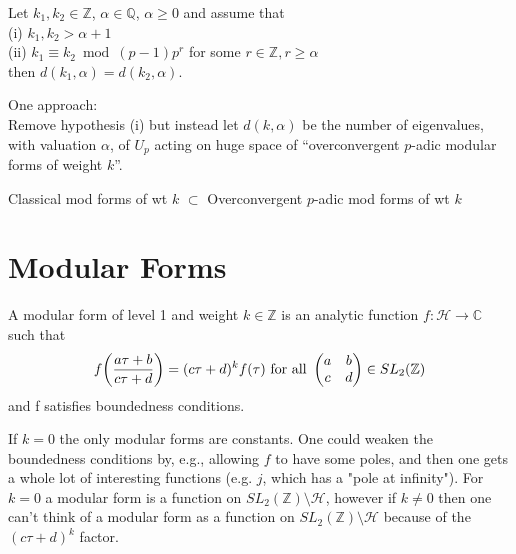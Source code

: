 \documentclass[11pt]{amsart}
\begin{document}
\begin{conj}
Let $k_1,k_2\in\mathbb Z$, $\alpha\in\mathbb Q$, $\alpha\geq 0$ and
assume that\\
(i) $k_1,k_2 > \alpha + 1$\\
(ii) $k_1 \equiv k_2 \bmod (p-1)p^r$ for some $r\in\mathbb Z, r\geq\alpha$\\
then $d(k_1,\alpha) = d(k_2,\alpha)$.
\end{conj}

\medskip

One approach:\\
Remove hypothesis (i) but instead let $d(k,\alpha)$ be the number of
eigenvalues, with valuation $\alpha$, of $U_p$ acting on huge space of
``overconvergent $p$-adic
modular forms of weight $k$''.
\begin{center}
Classical mod forms of wt $k$ $\subset$ Overconvergent
$p$-adic mod forms of wt $k$
\end{center}

\section{Modular Forms}

\begin{defn}
A modular form of level 1 and weight $k\in\mathbb Z$ is an analytic
function $f:\mathcal H \to \mathbb C$ such that
\begin{align*}
f\biggl( {a\tau + b \over c\tau + d} \biggr) = (c\tau +d)^kf(\tau)
\text{ for all } \begin{pmatrix} a&b \\ c&d \end{pmatrix}\in
SL_2(\mathbb Z)
\end{align*}
and f satisfies boundedness conditions.
\end{defn}

If $k=0$ the only modular forms are constants. One could weaken
the boundedness conditions by, e.g., allowing $f$ to have some poles,
and then one gets a whole lot of interesting functions (e.g. $j$,
which has a "pole at infinity"). For $k=0$ a modular form is a
function on $SL_2(\mathbb Z)\setminus\mathcal H$, however if $k\ne 0$
then one can't think of a modular form as a function on $SL_2(\mathbb
Z)\setminus\mathcal H$ because of the $(c\tau +d)^k$ factor.\\
\end{document}
